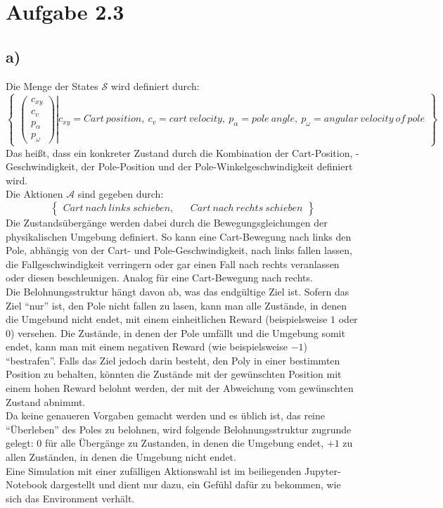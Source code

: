 \documentclass[11pt]{article}
\begin{document}
\section*{Aufgabe 2.3}

\subsection*{a)}

Die Menge der States $\mathcal{S}$ wird definiert durch:
\[ %
\begin{Bmatrix}
    \left.
    \begin{pmatrix}
        c_{xy}\\
        c_v\\
        p_\alpha\\
        p_\omega
    \end{pmatrix}
    \right\vert
    c_{xy} = Cart~position,~c_v = cart~velocity,~p_\alpha = pole~angle,~p_\omega = angular~velocity~of~pole
\end{Bmatrix}
\]%
Das heißt, dass ein konkreter Zustand durch die Kombination der Cart-Position, -Geschwindigkeit, der Pole-Position und der Pole-Winkelgeschwindigkeit definiert wird.\\
Die Aktionen $\mathcal{A}$ sind gegeben durch:
\[ %
\begin{Bmatrix}
    Cart~nach~links~schieben, && Cart~nach~rechts~schieben
\end{Bmatrix}
\]%
Die Zustandsübergänge werden dabei durch die Bewegungsgleichungen der physikalischen Umgebung definiert. So kann eine Cart-Bewegung nach links den Pole, abhängig von der Cart- und Pole-Geschwindigkeit, nach links fallen lassen, die Fallgeschwindigkeit verringern oder gar einen Fall nach rechts veranlassen oder diesen beschleunigen. Analog für eine Cart-Bewegung nach rechts.\\
Die Belohnungsstruktur hängt davon ab, was das endgültige Ziel ist. Sofern das Ziel ``nur'' ist, den Pole nicht fallen zu lasen, kann man alle Zustände, in denen die Umgebund nicht endet, mit einem einheitlichen Reward (beispielsweise $1$ oder $0$) versehen. Die Zustände, in denen der Pole umfällt und die Umgebung somit endet, kann man mit einem negativen Reward (wie beispielsweise $-1$) ``bestrafen''. Falls das Ziel jedoch darin besteht, den Poly in einer bestimmten Position zu behalten, könnten die Zustände mit der gewünschten Position mit einem hohen Reward belohnt werden, der mit der Abweichung vom gewünschten Zustand abnimmt.\\
Da keine genaueren Vorgaben gemacht werden und es üblich ist, das reine ``Überleben'' des Poles zu belohnen, wird folgende Belohnungsstruktur zugrunde gelegt: $0$ für alle Übergänge zu Zustanden, in denen die Umgebung endet, $+1$ zu allen Zuständen, in denen die Umgebung nicht endet. \\
Eine Simulation mit einer zufälligen Aktionswahl ist im beiliegenden Jupyter-Notebook dargestellt und dient nur dazu, ein Gefühl dafür zu bekommen, wie sich das Environment verhält.
\end{document}
